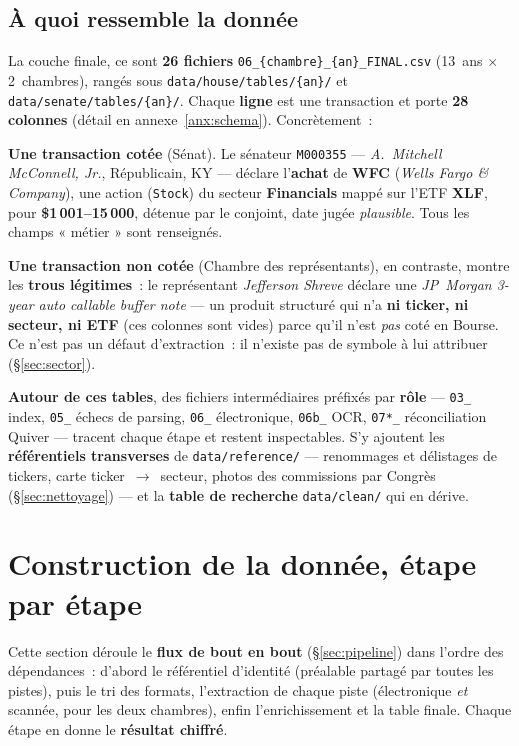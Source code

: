 \documentclass[11pt,a4paper]{article}
\newcommand{\co}[1]{\texttt{\small #1}}
\begin{document}
\subsection{À quoi ressemble la donnée}
\label{sec:numbering}
La couche finale, ce sont \textbf{26 fichiers} \co{06_\{chambre\}_\{an\}_FINAL.csv} (13~ans $\times$
2~chambres), rangés sous \co{data/house/tables/\{an\}/} et \co{data/senate/tables/\{an\}/}. Chaque
\textbf{ligne} est une transaction et porte \textbf{28 colonnes} (détail en annexe~\ref{anx:schema}).
Concrètement~:

\textbf{Une transaction cotée} (Sénat). Le sénateur \co{M000355} — \emph{A.~Mitchell McConnell, Jr.},
Républicain, KY — déclare l'\textbf{achat} de \textbf{WFC} (\emph{Wells Fargo \& Company}), une action
(\co{Stock}) du secteur \textbf{Financials} mappé sur l'ETF \textbf{XLF}, pour \textbf{\$1\,001--15\,000},
détenue par le conjoint, date jugée \emph{plausible}. Tous les champs « métier » sont renseignés.

\textbf{Une transaction non cotée} (Chambre des représentants), en contraste, montre les \textbf{trous
légitimes}~: le représentant \emph{Jefferson Shreve} déclare une \emph{JP~Morgan 3-year auto callable
buffer note} — un produit structuré qui n'a \textbf{ni ticker, ni secteur, ni ETF} (ces colonnes sont
vides) parce qu'il n'est \emph{pas} coté en Bourse. Ce n'est pas un défaut d'extraction~: il n'existe pas
de symbole à lui attribuer (\S{}\ref{sec:sector}).

\textbf{Autour de ces tables}, des fichiers intermédiaires préfixés par \textbf{rôle} — \co{03_} index,
\co{05_} échecs de parsing, \co{06_} électronique, \co{06b_} OCR, \co{07*_} réconciliation Quiver — tracent
chaque étape et restent inspectables. S'y ajoutent les \textbf{référentiels transverses} de
\co{data/reference/} — renommages et délistages de tickers, carte ticker~$\rightarrow$~secteur, photos des
commissions par Congrès (\S{}\ref{sec:nettoyage}) — et la \textbf{table de recherche} \co{data/clean/} qui en
dérive.

\section{Construction de la donnée, étape par étape}
\label{sec:construction}

Cette section déroule le \textbf{flux de bout en bout} (\S{}\ref{sec:pipeline}) dans l'ordre des dépendances~: d'abord le référentiel d'identité (préalable partagé par toutes les pistes), puis le tri des formats, l'extraction de
chaque piste (électronique \emph{et} scannée, pour les deux chambres), enfin l'enrichissement et la table
finale. Chaque étape en donne le \textbf{résultat chiffré}.
\end{document}
